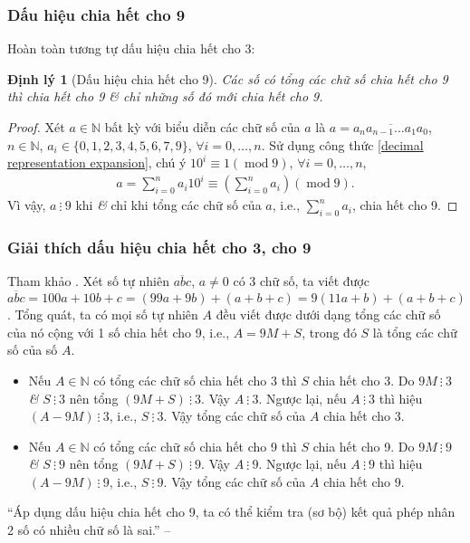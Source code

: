 \documentclass{article}
\numberwithin{equation}{section}
\newtheorem{dinhly}{Định lý}[section]
\begin{document}
\subsubsection{Dấu hiệu chia hết cho 9}
Hoàn toàn tương tự dấu hiệu chia hết cho 3:

\begin{dinhly}[Dấu hiệu chia hết cho 9]
	Các số có tổng các chữ số chia hết cho 9 thì chia hết cho 9 \textit{\&} chỉ những số đó mới chia hết cho 9.
\end{dinhly}

\begin{proof}[Proof]
	Xét $a\in\mathbb{N}$ bất kỳ với biểu diễn các chữ số của $a$ là $a = \overline{a_na_{n-1}\ldots a_1a_0}$, $n\in\mathbb{N}$, $a_i\in\{0,1,2,3,4,5,6,7,9\}$, $\forall i = 0,\ldots,n$. Sử dụng công thức \eqref{decimal representation expansion}, chú ý $10^i\equiv 1(\operatorname{mod} 9)$, $\forall i = 0,\ldots,n$,
	\begin{align*}
		a = \sum_{i=0}^n a_i10^i\equiv\left(\sum_{i=0}^n a_i\right)(\operatorname{mod} 9).
	\end{align*}
	Vì vậy, $a\ \vdots\ 9$ khi \textit{\&} chỉ khi tổng các chữ số của $a$, i.e., $\sum_{i=0}^n a_i$, chia hết cho 9.
\end{proof}

\subsubsection{Giải thích dấu hiệu chia hết cho 3, cho 9}
Tham khảo \cite[p. 40]{SGK_Toan_6_Canh_Dieu_tap_1}. Xét số tự nhiên $\overline{abc}$, $a\ne 0$ có 3 chữ số, ta viết được $\overline{abc} = 100a + 10b + c = (99a + 9b) + (a + b + c) = 9(11a + b) + (a + b + c)$. Tổng quát, ta có mọi số tự nhiên $A$ đều viết được dưới dạng tổng các chữ số của nó cộng với 1 số chia hết cho 9, i.e., $A = 9M + S$, trong đó $S$ là tổng các chữ số của số $A$.
\begin{itemize}
	\item Nếu $A\in\mathbb{N}$ có tổng các chữ số chia hết cho 3 thì $S$ chia hết cho 3. Do $9M\ \vdots\ 3$ \textit{\&} $S\ \vdots\ 3$ nên tổng $(9M + S)\ \vdots\ 3$. Vậy $A\ \vdots\ 3$. Ngược lại, nếu $A\ \vdots\ 3$ thì hiệu $(A - 9M)\ \vdots\ 3$, i.e., $S\ \vdots\ 3$. Vậy tổng các chữ số của $A$ chia hết cho 3.
	\item Nếu $A\in\mathbb{N}$ có tổng các chữ số chia hết cho 9 thì $S$ chia hết cho 9. Do $9M\ \vdots\ 9$ \textit{\&} $S\ \vdots\ 9$ nên tổng $(9M + S)\ \vdots\ 9$. Vậy $A\ \vdots\ 9$. Ngược lại, nếu $A\ \vdots\ 9$  thì hiệu $(A - 9M)\ \vdots\ 9$, i.e., $S\ \vdots\ 9$. Vậy tổng các chữ số của $A$ chia hết cho 9.
\end{itemize}
``Áp dụng dấu hiệu chia hết cho 9, ta có thể kiểm tra (sơ bộ) kết quả phép nhân 2 số có nhiều chữ số là sai.'' -- \cite[p. 40]{SGK_Toan_6_Canh_Dieu_tap_1}
\end{document}

